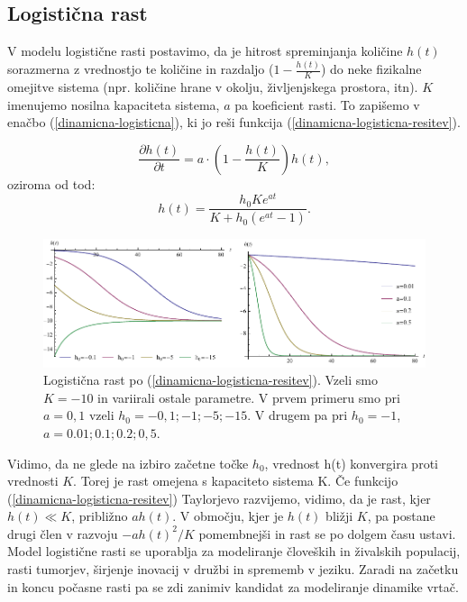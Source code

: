 \documentclass[a4paper, twoside, 12pt]{book}
\begin{document}
\subsection{Logistična rast}

V modelu logistične rasti postavimo, da je hitrost spreminjanja količine $h(t)$ sorazmerna z vrednostjo te količine in razdaljo ($1 - \frac{h(t)}{K}$) do neke fizikalne omejitve sistema (npr. količine hrane v okolju, življenjskega prostora, itn). $K$ imenujemo nosilna kapaciteta sistema, $a$ pa koeficient rasti. To zapišemo v enačbo (\ref{dinamicna-logisticna}), ki jo reši funkcija (\ref{dinamicna-logisticna-resitev}).

    \begin{equation}
      \frac{\partial h(t)}{\partial t} = a \cdot \left( 1 - \frac{h(t)}{K} \right) h(t),
      \label{dinamicna-logisticna}
    \end{equation}
oziroma od tod:
    \begin{equation}
      h(t) = \frac{h_0 K e^{a t}}{K + h_0 (e^{a t}-1)}.
      \label{dinamicna-logisticna-resitev}
    \end{equation}

    \begin{figure}[h]
      \begin{center}
        \includegraphics[width=14cm]{slike/logisticna-rast}
      \end{center}
      \caption{Logistična rast po (\ref{dinamicna-logisticna-resitev}). Vzeli smo $K=-10$ in variirali ostale parametre. V prvem primeru smo pri $a=0,1$ vzeli $h_0=-0,1;-1;-5;-15$. V drugem pa pri $h_0=-1$, $a=0.01;0.1;0.2;0,5$.}
      \label{fig:logisticna-rast}
    \end{figure}

    Vidimo, da ne glede na izbiro začetne točke $h_0$, vrednost h(t) konvergira proti vrednosti $K$. Torej je rast omejena s kapaciteto sistema K.
    Če funkcijo (\ref{dinamicna-logisticna-resitev}) Taylorjevo razvijemo, vidimo, da je rast, kjer $h(t) \ll K$, približno $a h(t)$. V območju, kjer je $h(t)$ bližji $K$, pa postane drugi člen v razvoju $-a h(t)^2 / K$ pomembnejši in rast se po dolgem času ustavi.\\
    Model logistične rasti se uporablja za modeliranje človeških in živalskih populacij, rasti tumorjev, širjenje inovacij v družbi in sprememb v jeziku. Zaradi na začetku in koncu počasne rasti pa se zdi zanimiv kandidat za modeliranje dinamike vrtač.
\end{document}
